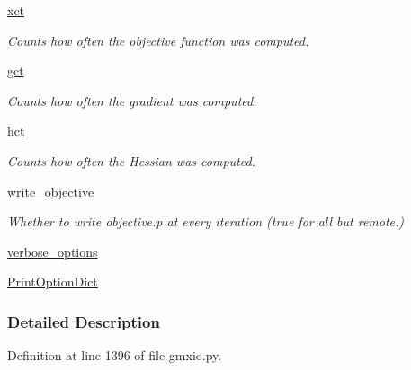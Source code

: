 \begin{DoxyCompactItemize}
\hyperlink{classforcebalance_1_1target_1_1Target_aad2e385cfbf7b4a68f1c2cb41133fe82}{xct}
\begin{DoxyCompactList}\small\item\em Counts how often the objective function was computed. \end{DoxyCompactList}\item 
\hyperlink{classforcebalance_1_1target_1_1Target_aa625ac88c6744eb14ef281d9496d0dbb}{gct}
\begin{DoxyCompactList}\small\item\em Counts how often the gradient was computed. \end{DoxyCompactList}\item 
\hyperlink{classforcebalance_1_1target_1_1Target_a5b5a42f78052b47f29ed4b940c6111a1}{hct}
\begin{DoxyCompactList}\small\item\em Counts how often the Hessian was computed. \end{DoxyCompactList}\item 
\hyperlink{classforcebalance_1_1target_1_1Target_a7a95624dfe03f0cee0e5f1ae09db306a}{write\-\_\-objective}
\begin{DoxyCompactList}\small\item\em Whether to write objective.\-p at every iteration (true for all but remote.) \end{DoxyCompactList}\item 
\hyperlink{classforcebalance_1_1BaseClass_afd68efa29ccd2f320f4cf82198214aac}{verbose\-\_\-options}
\item 
\hyperlink{classforcebalance_1_1BaseClass_afc6659278497d7245bc492ecf405ccae}{Print\-Option\-Dict}
\end{DoxyCompactItemize}


\subsubsection{Detailed Description}


Definition at line 1396 of file gmxio.\-py.




